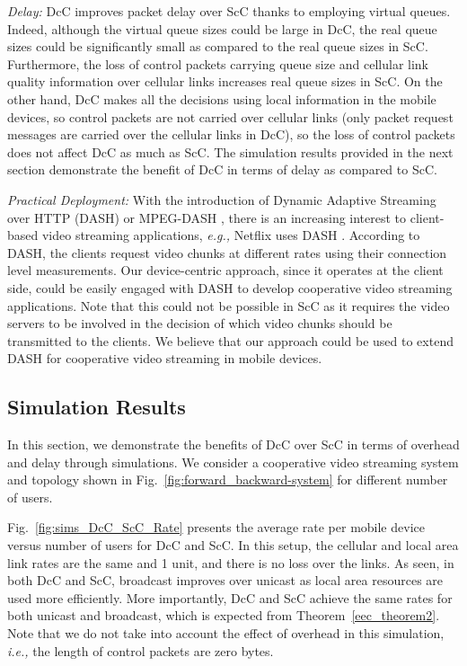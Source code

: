 \documentclass[conference]{IEEEtran}
\newcommand{\ie}{{\em i.e., }}
\newcommand{\eg}{{\em e.g., }}
\begin{document}
{\em Delay:} DcC improves packet delay over ScC thanks to employing virtual queues. Indeed, although the virtual queue sizes could be large in DcC, the real queue sizes could be significantly small as compared to the real queue sizes in ScC. Furthermore, the loss of control packets carrying queue size and cellular link quality information over cellular links increases real queue sizes in ScC. On the other hand, DcC makes all the decisions using local information in the mobile devices, so control packets are not carried over cellular links (only packet request messages are carried over the cellular links in DcC), so the loss of control packets does not affect DcC as much as ScC. The simulation results provided in the next section demonstrate the benefit of DcC in terms of delay as compared to ScC.

{\em Practical Deployment:} With the introduction of Dynamic Adaptive Streaming over HTTP (DASH) or MPEG-DASH \cite{dash}, there is an increasing interest to client-based video streaming applications, \eg Netflix uses DASH \cite{netflixdash}. According to DASH, the clients request video chunks at different rates using their connection level measurements. Our device-centric approach, since it operates at the client side, could be easily engaged with DASH to develop cooperative video streaming applications. Note that this could not be possible in ScC as it requires the video servers to be involved in the decision of which video chunks should be transmitted to the clients. We believe that our approach could be used to extend DASH for cooperative video streaming in mobile devices.

\subsection{Simulation Results}
In this section, we demonstrate the benefits of DcC over ScC in terms of overhead and delay through simulations. We consider a cooperative video streaming system and topology shown in Fig.~\ref{fig:forward_backward-system} for different number of users.

Fig.~\ref{fig:sims_DcC_ScC_Rate} presents the average rate per mobile device versus number of users for DcC and ScC. In this setup, the cellular and local area link rates are the same and 1 unit, and there is no loss over the links. As seen, in both DcC and ScC, broadcast improves over unicast as local area resources are used more efficiently. More importantly, DcC and ScC achieve the same rates for both unicast and broadcast, which is expected from Theorem~\ref{eec_theorem2}. Note that we do not take into account the effect of overhead in this simulation, \ie the length of control packets are zero bytes.
\end{document}
